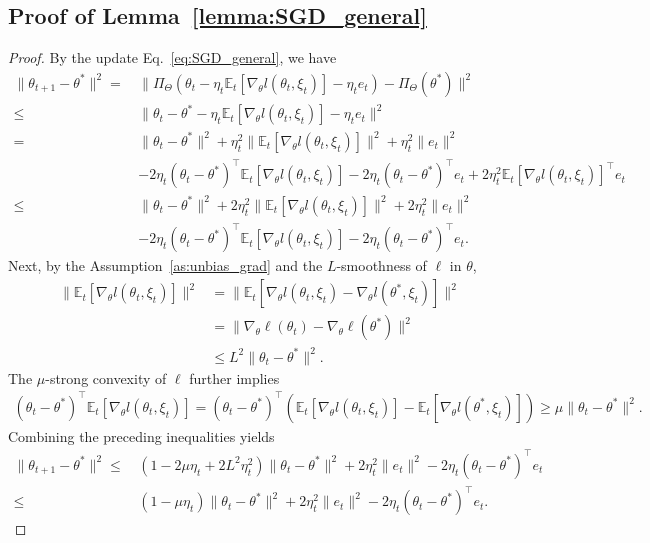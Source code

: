 \documentclass[11 pt]{article}
\begin{document}
\subsection{Proof of Lemma~\ref{lemma:SGD_general}}
\begin{proof} \label{proof:SGD_general}
By the update Eq.~\eqref{eq:SGD_general}, we have
\begin{align*}
\|\theta_{t+1}-\theta^*\|^2=\,&\|\Pi_\Theta(\theta_t-\eta_t \mathbb{E}_{t}[\nabla_\theta l(\theta_{t},\xi_t)]-\eta_t e_t)-\Pi_\Theta(\theta^*)\|^2\\
    \leq\,&\|\theta_t-\theta^*-\eta_t \mathbb{E}_{t}[\nabla_\theta l(\theta_{t},\xi_t)]-\eta_t e_t\|^2\tag{$\Pi_\Theta$ is non-expansive w.r.t. $\|\cdot\|$}\\
    = \,&\|\theta_t-\theta^*\|^2+\eta_t^2\|\mathbb{E}_{t}[\nabla_\theta l(\theta_{t},\xi_t)]\|^2+\eta_t^2\|e_t\|^2\\
    &-2\eta_t (\theta_t-\theta^*)^\top \mathbb{E}_{t}[\nabla_\theta l(\theta_{t},\xi_t)]-2\eta_t(\theta_t-\theta^*)^\top e_t+2\eta_t^2\mathbb{E}_{t}[\nabla_\theta l(\theta_{t},\xi_t)]^\top e_t\\
    {\leq} \,&\|\theta_t-\theta^*\|^2+2\eta_t^2\|\mathbb{E}_{t}[\nabla_\theta l(\theta_{t},\xi_t)]\|^2+2\eta_t^2\|e_t\|^2\\
    &-2\eta_t (\theta_t-\theta^*)^\top \mathbb{E}_{t}[\nabla_\theta l(\theta_{t},\xi_t)]-2\eta_t(\theta_t-\theta^*)^\top e_t. \tag{$a^\top b\leq \frac12\left( \|a\|^2+\|b\|^2\right)$}
\end{align*}
Next, by the Assumption~\ref{as:unbias_grad} and the $L$-smoothness of $\ell$ in $\theta$,
\begin{align*}
    \|\mathbb{E}_{t}[\nabla_\theta l(\theta_{t},\xi_t)]\|^2&=\|\mathbb{E}_{t}\left[\nabla_\theta l(\theta_{t},\xi_t)-\nabla_\theta l(\theta^*,\xi_t)\right]\|^2 \\
    &=\|\nabla_\theta\ell(\theta_t)-\nabla_\theta\ell(\theta^*) \|^2 \\
    &\leq L^2\|\theta_t-\theta^*\|^2.
\end{align*}
The $\mu$-strong convexity of $\ell$ further implies
\begin{align*}
    (\theta_t-\theta^*)^\top \mathbb{E}_{t}[\nabla_\theta l(\theta_{t},\xi_t)]=(\theta_t-\theta^*)^\top (\mathbb{E}_{t}[\nabla_\theta l(\theta_{t},\xi_t)]-\mathbb{E}_{t}[\nabla_\theta l(\theta^*,\xi_t)])\geq \mu\|\theta_t-\theta^*\|^2.
\end{align*}
Combining the preceding inequalities yields
\begin{align*}
    \|\theta_{t+1}-\theta^*\|^2
    \leq\,& (1-2\mu\eta_t+2L^2\eta_t^2)\|\theta_t-\theta^*\|^2+2\eta_t^2\|e_t\|^2-2\eta_t(\theta_t-\theta^*)^\top e_t\\
    {\leq} \,&(1-\mu\eta_t)\|\theta_t-\theta^*\|^2+2\eta_t^2\|e_t\|^2-2\eta_t(\theta_t-\theta^*)^\top e_t. \tag{$\eta_t\leq \mu/(2L^2)$}
\end{align*}


\end{proof}
\end{document}
